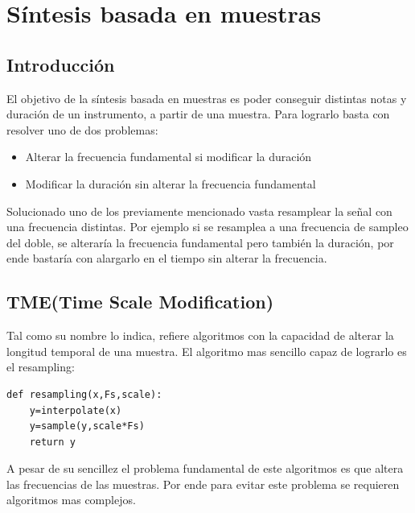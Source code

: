 \documentclass[../ASSD_TP2.tex]{subfiles}
\begin{document}
\section*{Síntesis basada en muestras}
\subsection*{Introducción}
El objetivo de la síntesis basada en muestras es poder conseguir distintas notas y duración de un instrumento, a partir de una muestra. Para lograrlo basta con resolver uno de dos problemas:
\begin{itemize}
\item Alterar la frecuencia fundamental si modificar la duración
\item Modificar la duración sin alterar la frecuencia fundamental
\end{itemize}

Solucionado uno de los previamente mencionado vasta resamplear la se\~nal con una frecuencia distintas. Por ejemplo si se resamplea a una frecuencia de sampleo del doble, se alteraría la frecuencia fundamental pero también la duración, por ende bastaría con alargarlo en el tiempo sin alterar la frecuencia.
\subsection*{TME(Time Scale Modification)}
Tal como su nombre lo indica, refiere  algoritmos con la capacidad de alterar la longitud temporal de una muestra. El algoritmo mas sencillo capaz de lograrlo es el resampling:

\begin{lstlisting}
def resampling(x,Fs,scale):
	y=interpolate(x)
	y=sample(y,scale*Fs)
	return y
\end{lstlisting}
A pesar de su sencillez el problema fundamental de este algoritmos es que altera las frecuencias de las muestras. Por ende para evitar este problema se requieren algoritmos mas complejos.
\end{document}
